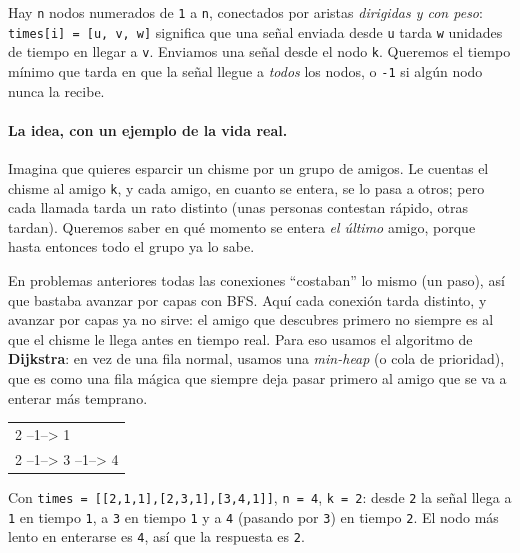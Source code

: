 
Hay \texttt{n} nodos numerados de \texttt{1} a \texttt{n}, conectados por
aristas \emph{dirigidas y con peso}: \texttt{times[i] = [u, v, w]} significa
que una señal enviada desde \texttt{u} tarda \texttt{w} unidades de tiempo en
llegar a \texttt{v}. Enviamos una señal desde el nodo \texttt{k}. Queremos el
tiempo mínimo que tarda en que la señal llegue a \emph{todos} los nodos, o
\texttt{-1} si algún nodo nunca la recibe.

\paragraph{La idea, con un ejemplo de la vida real.} Imagina que quieres
esparcir un chisme por un grupo de amigos. Le cuentas el chisme al amigo
\texttt{k}, y cada amigo, en cuanto se entera, se lo pasa a otros; pero cada
llamada tarda un rato distinto (unas personas contestan rápido, otras
tardan). Queremos saber en qué momento se entera \emph{el último} amigo,
porque hasta entonces todo el grupo ya lo sabe.

En problemas anteriores todas las conexiones ``costaban'' lo mismo (un
paso), así que bastaba avanzar por capas con BFS. Aquí cada conexión tarda
distinto, y avanzar por capas ya no sirve: el amigo que descubres primero no
siempre es al que el chisme le llega antes en tiempo real. Para eso usamos el
algoritmo de \textbf{Dijkstra}: en vez de una fila normal, usamos una
\emph{min-heap} (o cola de prioridad), que es como una fila mágica que
siempre deja pasar primero al amigo que se va a enterar más temprano.

\begin{center}
\ttfamily
\begin{tabular}{l}
2 --1--> 1\\
2 --1--> 3 --1--> 4\\
\end{tabular}
\end{center}

\noindent Con \texttt{times = [[2,1,1],[2,3,1],[3,4,1]]}, \texttt{n = 4},
\texttt{k = 2}: desde \texttt{2} la señal llega a \texttt{1} en tiempo
\texttt{1}, a \texttt{3} en tiempo \texttt{1} y a \texttt{4} (pasando por
\texttt{3}) en tiempo \texttt{2}. El nodo más lento en enterarse es \texttt{4},
así que la respuesta es \texttt{2}.

